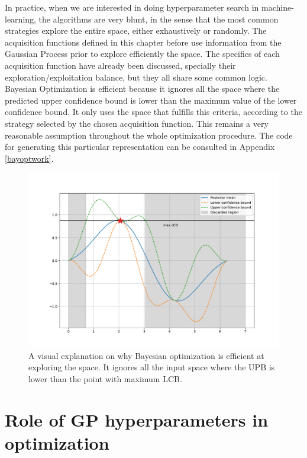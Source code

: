 \documentclass[10pt,a4paper,twoside]{book}
\begin{document}
In practice, when we are interested in doing hyperparameter search in machine-learning, the algorithms are very blunt, in the sense that the most common strategies explore the entire space, either exhaustively or randomly. The acquisition functions defined in this chapter before use information from the Gaussian Process prior to explore efficiently the space. The specifics of each acquisition function have already been discussed, specially their exploration/exploitation balance, but they all share some common logic.\\

Bayesian Optimization is efficient because it ignores all the space where the predicted upper confidence bound is lower than the maximum value of the lower confidence bound. It only uses the space that fulfills this criteria, according to the strategy selected by the chosen acquisition function. This remains a very reasonable assumption throughout the whole optimization procedure. The code for generating this particular representation can be consulted in Appendix \ref{bayoptwork}.

\begin{figure}
	\caption{A visual explanation on why Bayesian optimization is efficient at exploring the space. It ignores all the input space where the UPB is lower than the point with maximum LCB.}
	\label{fig:explanation}
	\includegraphics[width=\textwidth]{figures/chapter3/explanation}
\end{figure}


\section{Role of GP hyperparameters in optimization}
\end{document}
